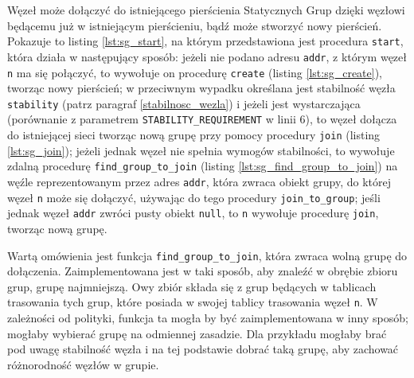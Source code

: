 \documentclass[12pt, twoside, openany]{report}
\begin{document}
Węzeł może dołączyć do istniejącego pierścienia Statycznych Grup dzięki węzłowi będącemu już w istniejącym pierścieniu, bądź może stworzyć nowy pierścień. Pokazuje to listing \ref{lst:sg_start}, na którym przedstawiona jest procedura \texttt{start}, która działa w następujący sposób: jeżeli nie podano adresu \texttt{addr}, z którym węzeł \texttt{n} ma się połączyć, to wywołuje on procedurę \texttt{create} (listing \ref{lst:sg_create}), tworząc nowy pierścień; w przeciwnym wypadku określana jest stabilność węzła \texttt{stability} (patrz paragraf \ref{stabilnosc_wezla}) i jeżeli jest wystarczająca (porównanie z parametrem \texttt{STABILITY\_REQUIREMENT} w linii 6), to węzeł dołącza do istniejącej sieci tworząc nową grupę przy pomocy procedury \texttt{join} (listing \ref{lst:sg_join}); jeżeli jednak węzeł nie spełnia wymogów stabilności, to wywołuje zdalną procedurę \texttt{find\_group\_to\_join} (listing \ref{lst:sg_find_group_to_join}) na węźle reprezentowanym przez adres \texttt{addr}, która zwraca obiekt grupy, do której węzeł \texttt{n} może się dołączyć, używając do tego procedury \texttt{join\_to\_group}; jeśli jednak węzeł \texttt{addr} zwróci pusty obiekt \texttt{null}, to \texttt{n} wywołuje procedurę \texttt{join}, tworząc nową grupę.











Wartą omówienia jest funkcja \texttt{find\_group\_to\_join}, która zwraca wolną grupę do dołączenia. Zaimplementowana jest w taki sposób, aby znaleźć w obrębie zbioru grup, grupę najmniejszą. Owy zbiór składa się z grup będących w tablicach trasowania tych grup, które posiada w swojej tablicy trasowania węzeł \texttt{n}. W zależności od polityki, funkcja ta mogła by być zaimplementowana w inny sposób; mogłaby wybierać grupę na odmiennej zasadzie. Dla przykładu mogłaby brać pod uwagę stabilność węzła i na tej podstawie dobrać taką grupę, aby zachować różnorodność węzłów w grupie.
\end{document}
